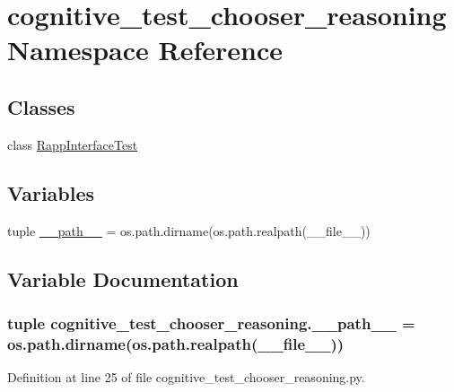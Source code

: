 \hypertarget{namespacecognitive__test__chooser__reasoning}{\section{cognitive\-\_\-test\-\_\-chooser\-\_\-reasoning Namespace Reference}
\label{namespacecognitive__test__chooser__reasoning}
}
\subsection*{Classes}
\begin{DoxyCompactItemize}
\item 
class \hyperlink{classcognitive__test__chooser__reasoning_1_1RappInterfaceTest}{Rapp\-Interface\-Test}
\end{DoxyCompactItemize}
\subsection*{Variables}
\begin{DoxyCompactItemize}
\item 
tuple \hyperlink{namespacecognitive__test__chooser__reasoning_a401806722db6435ae290e7961bc1c37f}{\-\_\-\-\_\-path\-\_\-\-\_\-} = os.\-path.\-dirname(os.\-path.\-realpath(\-\_\-\-\_\-file\-\_\-\-\_\-))
\end{DoxyCompactItemize}


\subsection{Variable Documentation}
\hypertarget{namespacecognitive__test__chooser__reasoning_a401806722db6435ae290e7961bc1c37f}{
\subsubsection[{\-\_\-\-\_\-path\-\_\-\-\_\-}]{\setlength{\rightskip}{0pt plus 5cm}tuple cognitive\-\_\-test\-\_\-chooser\-\_\-reasoning.\-\_\-\-\_\-path\-\_\-\-\_\- = os.\-path.\-dirname(os.\-path.\-realpath(\-\_\-\-\_\-file\-\_\-\-\_\-))}}\label{namespacecognitive__test__chooser__reasoning_a401806722db6435ae290e7961bc1c37f}


Definition at line 25 of file cognitive\-\_\-test\-\_\-chooser\-\_\-reasoning.\-py.

